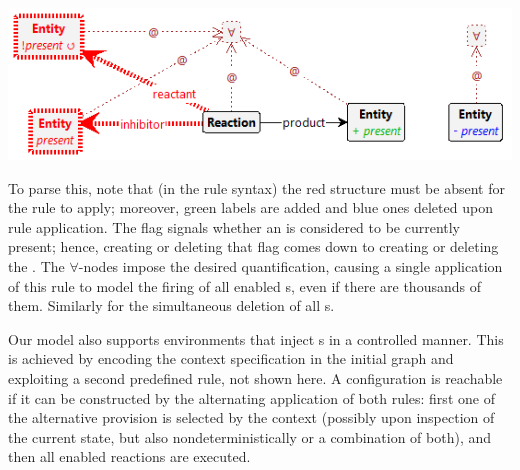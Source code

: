 \medskip

\begin{center}
\includegraphics[scale=.40]{react}
\end{center}

\medskip

To parse this, note that (in the \GROOVE rule syntax) the red structure must be absent for the rule to apply; moreover, green labels are added and blue ones deleted upon rule application. The  flag signals whether an  is considered to be currently present; hence, creating or deleting that flag comes down to creating or deleting the . The $\forall$-nodes impose the desired quantification, causing a single application of this rule to model the firing of all enabled s, even if there are thousands of them.
Similarly for the simultaneous deletion of all s.

Our model also supports environments that inject s in a controlled manner. This is achieved by encoding the context specification in the initial graph and exploiting a second predefined rule, not shown here. A configuration is reachable if it can be constructed by the alternating application of both rules: first one of the alternative provision is selected by the context (possibly upon inspection of the current state, but also nondeterministically or a combination of both), and then all enabled reactions are executed.

